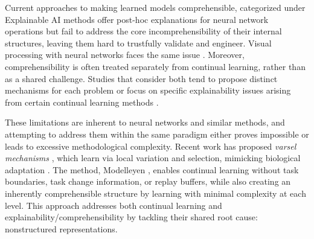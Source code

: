 Current approaches to making learned models comprehensible, categorized under Explainable AI methods \cite{xu2019explainable, kashefi2023explainability} offer post-hoc explanations for neural network operations but fail to address the core incomprehensibility of their internal structures, leaving them hard to trustfully validate and engineer. Visual processing with neural networks faces the same issue \cite{kashefi2023explainability}. Moreover, comprehensibility is often treated separately from continual learning, rather than as a shared challenge. Studies that consider both tend to propose distinct mechanisms for each problem \cite{roy2022interpretable} or focus on specific explainability issues arising from certain continual learning methods \cite{rymarczyk2023icicle, cossu2024drifting}.





These limitations are inherent to neural networks and similar methods, and attempting to address them within the same paradigm either proves impossible or leads to excessive methodological complexity. Recent work has proposed \textit{varsel mechanisms} \cite{erden2025agential, erden2025agential_extendedabs}, which learn via local variation and selection, mimicking biological adaptation \cite{marc2005plausibility, gerhart2007theory}. The method, Modelleyen \cite{Erden2024Modelleyen, erden2025agential, erden2025agential_extendedabs}, enables continual learning without task boundaries, task change information, or replay buffers, while also creating an inherently comprehensible structure by learning with minimal complexity at each level. This approach addresses both continual learning and explainability/comprehensibility by tackling their shared root cause: nonstructured representations.
